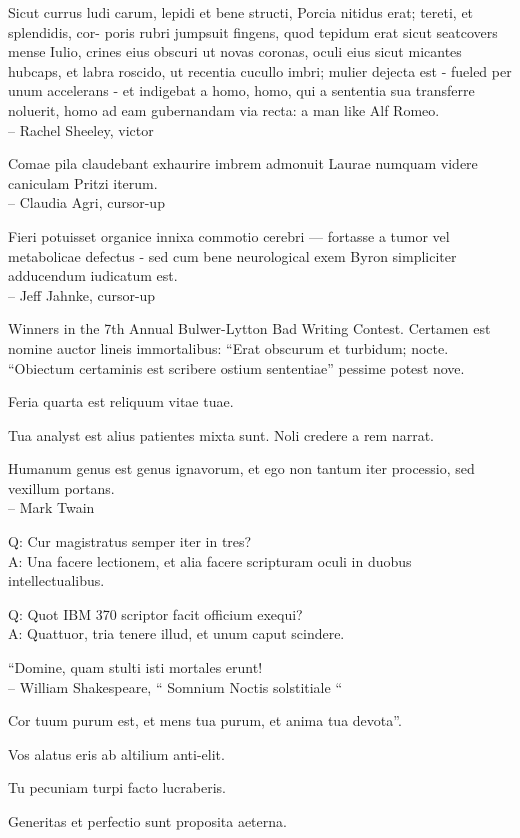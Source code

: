 \documentclass[titlepage,12pt]{memoir}
\begin{document}
Sicut currus ludi carum, lepidi et bene structi, Porcia nitidus erat;
tereti, et splendidis, cor- poris rubri jumpsuit fingens, quod tepidum erat
sicut seatcovers mense Iulio, crines eius obscuri ut novas coronas, oculi eius sicut micantes
hubcaps, et labra roscido, ut recentia cucullo imbri;
mulier dejecta est - fueled per unum accelerans - et indigebat a
homo, homo, qui a sententia sua transferre noluerit, homo ad eam gubernandam
via recta: a man like Alf Romeo.
\\-- Rachel Sheeley, victor

Comae pila claudebant exhaurire imbrem admonuit Laurae numquam
videre caniculam Pritzi iterum.
\\-- Claudia Agri, cursor-up

Fieri potuisset organice innixa commotio cerebri — fortasse a
tumor vel metabolicae defectus - sed cum bene neurological exem
Byron simpliciter adducendum iudicatum est.
\\-- Jeff Jahnke, cursor-up

Winners in the 7th Annual Bulwer-Lytton Bad Writing Contest. Certamen est
nomine auctor lineis immortalibus: “Erat obscurum et turbidum;
nocte. “Obiectum certaminis est scribere ostium sententiae”
pessime potest nove.

Feria quarta est reliquum vitae tuae.

Tua analyst est alius patientes mixta sunt. Noli credere a
rem narrat.

Humanum genus est genus ignavorum, et ego non tantum iter
processio, sed vexillum portans.
\\-- Mark Twain

Q: Cur magistratus semper iter in tres?\\
A: Una facere lectionem, et alia facere scripturam
oculi in duobus intellectualibus.

Q: Quot IBM 370 scriptor facit officium exequi?\\
A: Quattuor, tria tenere illud, et unum caput scindere.

“Domine, quam stulti isti mortales erunt!
\\-- William Shakespeare, “ Somnium Noctis solstitiale “

Cor tuum purum est, et mens tua purum, et anima tua devota”.

Vos alatus eris ab altilium anti-elit.

Tu pecuniam turpi facto lucraberis.

Generitas et perfectio sunt proposita aeterna.
\end{document}
